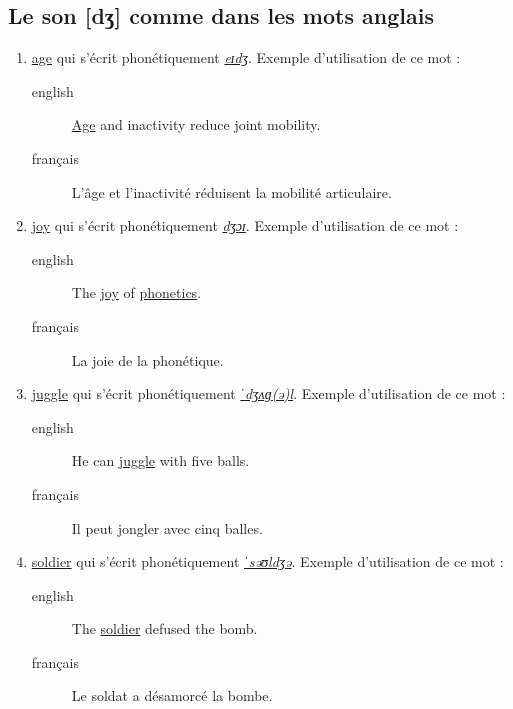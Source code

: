 \subsection{Le son [dʒ] comme dans les mots anglais}
\label{sec:org83b259c}
\begin{enumerate}
\item \href{http://www.wordreference.com/enfr/age}{age} qui s'écrit phonétiquement \href{https://en.oxforddictionaries.com/definition/age}{\emph{eɪdʒ}}. Exemple d'utilisation de ce
mot :
\begin{description}
\item[{english}] \textenglish{\href{https://youtu.be/wKU5khnuY\_Y}{Age} and inactivity reduce joint mobility.}
\item[{français}] L'âge et l'inactivité réduisent la mobilité
articulaire.
\end{description}
\item \href{http://www.wordreference.com/enfr/joy}{joy} qui s'écrit phonétiquement \href{https://en.oxforddictionaries.com/definition/joy}{\emph{dʒɔɪ}}. Exemple d'utilisation de ce
mot :
\begin{description}
\item[{english}] \textenglish{The \href{https://youtu.be/TyYIxGL2p6c}{joy} of \href{https://www.amazon.fr/gp/product/B013RQ72R2/ref=as\_li\_tl?ie=UTF8\&camp=1642\&creative=6746\&creativeASIN=B013RQ72R2\&linkCode=as2\&tag=wwwbecomefree-21\&linkId=e8ebecacb076d66dd3e5a435789050d5}{phonetics}.}
\item[{français}] La joie de la phonétique.
\end{description}
\item \href{http://www.wordreference.com/enfr/juggle}{juggle} qui s'écrit phonétiquement \href{https://en.oxforddictionaries.com/definition/juggle}{\emph{ˈdʒʌɡ(ə)l}}. Exemple
d'utilisation de ce mot :
\begin{description}
\item[{english}] \textenglish{He can \href{https://youtu.be/kCt1bmSASCI}{juggle} with five balls.}
\item[{français}] Il peut jongler avec cinq balles.
\end{description}
\item \href{http://www.wordreference.com/enfr/soldier}{soldier} qui s'écrit phonétiquement \href{https://en.oxforddictionaries.com/definition/soldier}{\emph{ˈsəʊldʒə}}. Exemple
d'utilisation de ce mot : 
\begin{description}
\item[{english}] \textenglish{The \href{https://youtu.be/ucoSdNM2Atw}{soldier} defused the bomb.}
\item[{français}] Le soldat a désamorcé la bombe.
\end{description}
\end{enumerate}
